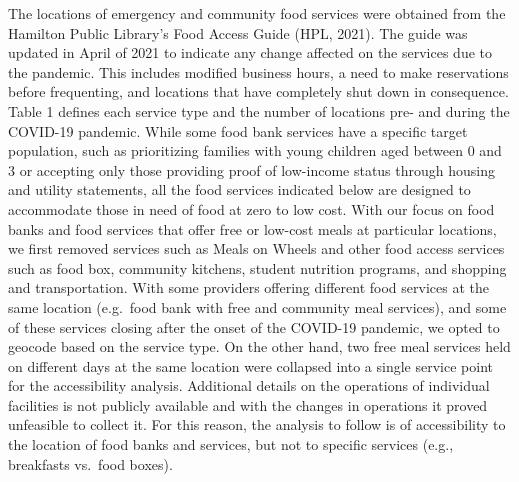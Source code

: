 \documentclass[]{elsarticle} %
\begin{document}
The locations of emergency and community food services were obtained
from the Hamilton Public Library's Food Access Guide (HPL, 2021). The
guide was updated in April of 2021 to indicate any change affected on
the services due to the pandemic. This includes modified business hours,
a need to make reservations before frequenting, and locations that have
completely shut down in consequence. Table 1 defines each service type
and the number of locations pre- and during the COVID-19 pandemic. While
some food bank services have a specific target population, such as
prioritizing families with young children aged between 0 and 3 or
accepting only those providing proof of low-income status through
housing and utility statements, all the food services indicated below
are designed to accommodate those in need of food at zero to low cost.
With our focus on food banks and food services that offer free or
low-cost meals at particular locations, we first removed services such
as Meals on Wheels and other food access services such as food box,
community kitchens, student nutrition programs, and shopping and
transportation. With some providers offering different food services at
the same location (e.g.~food bank with free and community meal
services), and some of these services closing after the onset of the
COVID-19 pandemic, we opted to geocode based on the service type. On the
other hand, two free meal services held on different days at the same
location were collapsed into a single service point for the
accessibility analysis. Additional details on the operations of
individual facilities is not publicly available and with the changes in
operations it proved unfeasible to collect it. For this reason, the
analysis to follow is of accessibility to the location of food banks and
services, but not to specific services (e.g., breakfasts vs.~food
boxes).
\end{document}
